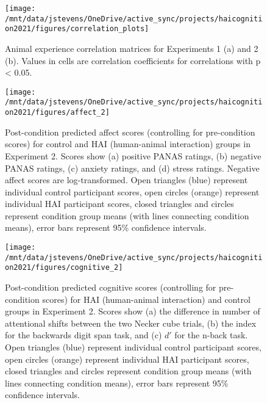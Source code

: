 \documentclass[
  english,
  ,doc,floatsintext]{apa6}
\begin{document}
\begin{figure}

{\centering \texttt{[image: /mnt/data/jstevens/OneDrive/active\_sync/projects/haicognition2021/figures/correlation\_plots]} 

}

\caption{Animal experience correlation matrices for Experiments 1 (a) and 2 (b). Values in cells are correlation coefficients for correlations with p \textless{} 0.05.}\label{fig:hai-corr-plots}
\end{figure}



\begin{figure}
\texttt{[image: /mnt/data/jstevens/OneDrive/active\_sync/projects/haicognition2021/figures/affect\_2]} \caption{Post-condition predicted affect scores (controlling for pre-condition scores) for control and HAI (human-animal interaction) groups in Experiment 2. Scores show (a) positive PANAS ratings, (b) negative PANAS ratings, (c) anxiety ratings, and (d) stress ratings. Negative affect scores are log-transformed. Open triangles (blue) represent individual control participant scores, open circles (orange) represent individual HAI participant scores, closed triangles and circles represent condition group means (with lines connecting condition means), error bars represent 95\% confidence intervals.}\label{fig:affect2}
\end{figure}



\begin{figure}
\texttt{[image: /mnt/data/jstevens/OneDrive/active\_sync/projects/haicognition2021/figures/cognitive\_2]} \caption{Post-condition predicted cognitive scores (controlling for pre-condition scores) for HAI (human-animal interaction) and control groups in Experiment 2. Scores show (a) the difference in number of attentional shifts between the two Necker cube trials, (b) the index for the backwards digit span task, and (c) \(d'\) for the n-back task. Open triangles (blue) represent individual control participant scores, open circles (orange) represent individual HAI participant scores, closed triangles and circles represent condition group means (with lines connecting condition means), error bars represent 95\% confidence intervals.}\label{fig:cognitive2}
\end{figure}

\clearpage
\end{document}
